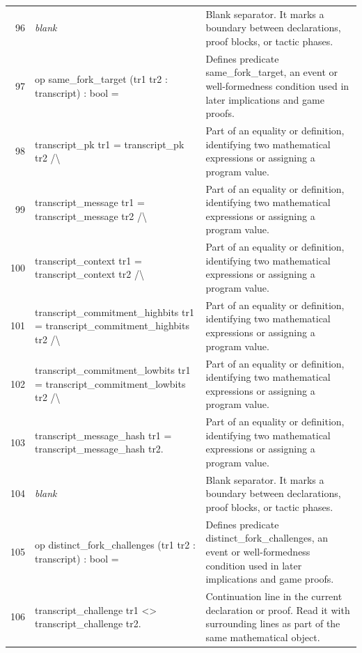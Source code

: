 \documentclass[10pt]{article}
\begin{document}
\begin{longtable}{r L{0.53\textwidth} L{0.37\textwidth}}
96 & {\ttfamily\scriptsize \emph{blank}} & Blank separator.  It marks a boundary between declarations, proof blocks, or tactic phases. \\
97 & {\ttfamily\scriptsize op same\_fork\_target (tr1 tr2 : transcript) : bool =} & Defines predicate same\_fork\_target, an event or well-formedness condition used in later implications and game proofs. \\
98 & {\ttfamily\scriptsize   transcript\_pk tr1 = transcript\_pk tr2 /\textbackslash{}} & Part of an equality or definition, identifying two mathematical expressions or assigning a program value. \\
99 & {\ttfamily\scriptsize   transcript\_message tr1 = transcript\_message tr2 /\textbackslash{}} & Part of an equality or definition, identifying two mathematical expressions or assigning a program value. \\
100 & {\ttfamily\scriptsize   transcript\_context tr1 = transcript\_context tr2 /\textbackslash{}} & Part of an equality or definition, identifying two mathematical expressions or assigning a program value. \\
101 & {\ttfamily\scriptsize   transcript\_commitment\_highbits tr1 = transcript\_commitment\_highbits tr2 /\textbackslash{}} & Part of an equality or definition, identifying two mathematical expressions or assigning a program value. \\
102 & {\ttfamily\scriptsize   transcript\_commitment\_lowbits tr1 = transcript\_commitment\_lowbits tr2 /\textbackslash{}} & Part of an equality or definition, identifying two mathematical expressions or assigning a program value. \\
103 & {\ttfamily\scriptsize   transcript\_message\_hash tr1 = transcript\_message\_hash tr2.} & Part of an equality or definition, identifying two mathematical expressions or assigning a program value. \\
104 & {\ttfamily\scriptsize \emph{blank}} & Blank separator.  It marks a boundary between declarations, proof blocks, or tactic phases. \\
105 & {\ttfamily\scriptsize op distinct\_fork\_challenges (tr1 tr2 : transcript) : bool =} & Defines predicate distinct\_fork\_challenges, an event or well-formedness condition used in later implications and game proofs. \\
106 & {\ttfamily\scriptsize   transcript\_challenge tr1 <> transcript\_challenge tr2.} & Continuation line in the current declaration or proof.  Read it with surrounding lines as part of the same mathematical object. \\

\end{longtable}
\end{document}
